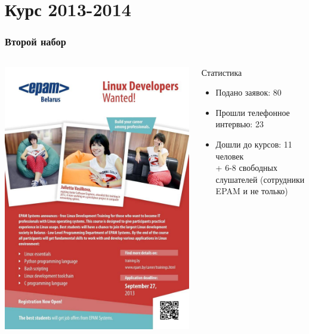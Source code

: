 \section[2013]{Курс 2013-2014}
\begin{frame}
\frametitle{Второй набор}

  \begin{columns}


	\includegraphics[width=\textwidth]{linux_courses_epam}

	  \begin{block}{Статистика}
		\begin{itemize}
		  \item Подано заявок: 80
		  \item Прошли телефонное интервью: 23
		  \item Дошли до курсов: 11 человек \\ + 6-8 свободных слушателей (сотрудники EPAM и не только)
		\end{itemize}
	  \end{block}
  \end{columns}
\end{frame}

